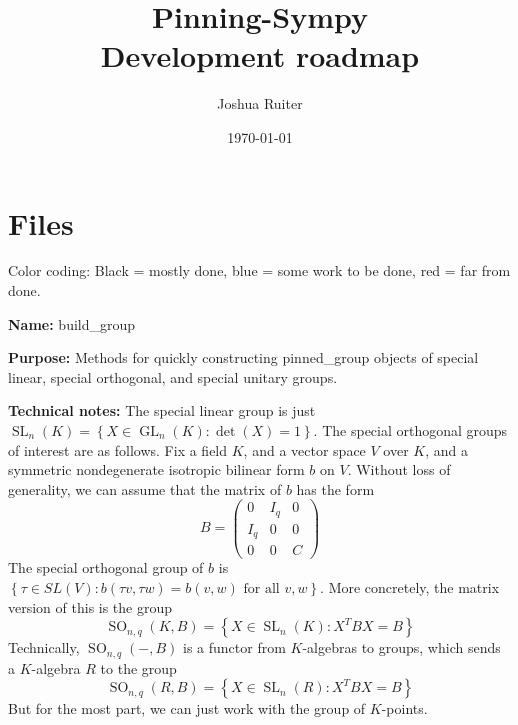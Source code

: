 \documentclass[12pt]{article}
\title{Pinning-Sympy \\
	Development roadmap}
\author{Joshua Ruiter}
\date{\today}
\newcommand{\lb}{\left\{}
\newcommand{\rb}{\right\}}
\newcommand{\tbf}{\textbf}
\DeclareMathOperator{\SL}{SL}
\DeclareMathOperator{\GL}{GL}
\DeclareMathOperator{\SO}{SO}
\begin{document}
\maketitle
\tableofcontents

\newpage

\section{Files}

Color coding: Black = mostly done, {\color{blue} blue = some work to be done}, {\color{red} red = far from done.}

\begin{mdframed}[linecolor=red]
\tbf{Name:} build\_group

\smallskip

\tbf{Purpose:} Methods for quickly constructing pinned\_group objects of special linear, special orthogonal, and special unitary groups.

\smallskip

\tbf{Technical notes:} The special linear group is just $\SL_n(K) = \lb X \in \GL_n(K) : \det(X) = 1 \rb$. The special orthogonal groups of interest are as follows. Fix a field $K$, and a vector space $V$ over $K$, and a symmetric nondegenerate isotropic bilinear form $b$ on $V$. Without loss of generality, we can assume that the matrix of $b$ has the form
\[
	B = \begin{pmatrix}
		0 & I_q & 0 \\
		I_q & 0 & 0 \\
		0 & 0 & C
	\end{pmatrix}
\]
The special orthogonal group of $b$ is $\lb \tau \in SL(V) : b(\tau v, \tau w) = b(v, w) \text{ for all } v,w \rb$. More concretely, the matrix version of this is the group
\[
	\SO_{n,q}(K,B) = \lb X \in \SL_n(K) : X^T B X = B \rb
\]
Technically, $\SO_{n,q}(-,B)$ is a functor from $K$-algebras to groups, which sends a $K$-algebra $R$ to the group
\[
	\SO_{n,q}(R,B) = \lb X \in \SL_n(R) : X^T B X = B \rb
\]
But for the most part, we can just work with the group of $K$-points. 


\end{mdframed}
\end{document}
